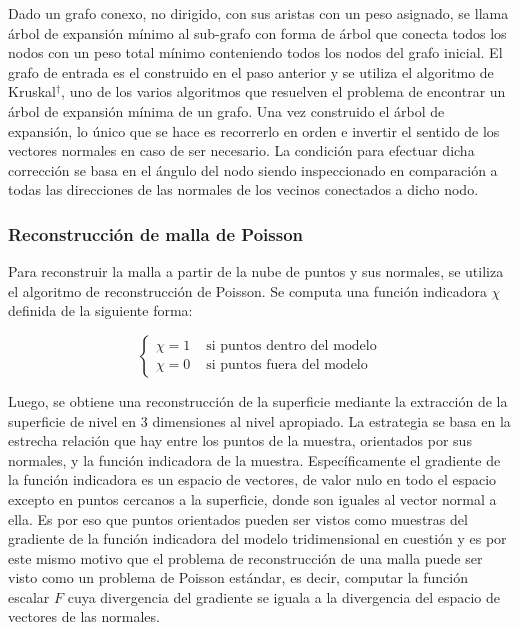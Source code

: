 Dado un grafo conexo, no dirigido, con sus aristas con un peso asignado, se llama árbol de expansión mínimo al sub-grafo con forma de árbol que conecta todos los nodos con un peso total mínimo conteniendo todos los nodos del grafo inicial. El grafo de entrada es el construido en el paso anterior y se utiliza el algoritmo de Kruskal$^\dagger$, uno de los varios algoritmos que resuelven el problema de encontrar un árbol de expansión mínima de un grafo.
Una vez construido el árbol de expansión, lo único que se hace es recorrerlo en orden e invertir el sentido de los vectores normales en caso de ser necesario. La condición para efectuar dicha corrección se basa en el ángulo del nodo siendo inspeccionado en comparación a todas las direcciones de las normales de los vecinos conectados a dicho nodo.

\subsubsection{Reconstrucción de malla de Poisson}

Para reconstruir la malla a partir de la nube de puntos y sus normales, se utiliza el algoritmo de reconstrucción de Poisson.
Se computa una función indicadora $\chi$ definida de la siguiente forma:

$$
\left\{ \begin{array}{rl}
 \chi = 1 & \mbox{ si puntos dentro del modelo} \\
 \chi = 0 & \mbox{ si puntos fuera del modelo}
       \end{array} \right.
$$

Luego, se obtiene una reconstrucción de la superficie mediante la extracción de la superficie de nivel en 3 dimensiones al nivel apropiado.
La estrategia se basa en la estrecha relación que hay entre los puntos de la muestra, orientados por sus normales, y la función indicadora de la muestra. Específicamente el gradiente de la función indicadora es un espacio de vectores, de valor nulo en todo el espacio excepto en puntos cercanos a la superficie, donde son iguales al vector normal a ella.
Es por eso que puntos orientados pueden ser vistos como muestras del gradiente de la función indicadora del modelo tridimensional en cuestión y es por este mismo motivo que el problema de reconstrucción de una malla puede ser visto como un problema de Poisson estándar, es decir, computar la función escalar $F$ cuya divergencia del gradiente se iguala a la divergencia del espacio de vectores de las normales.
